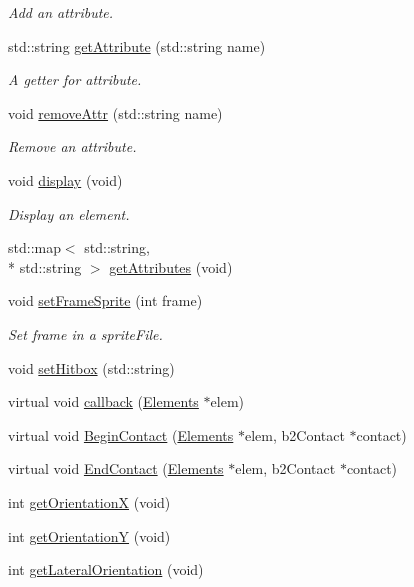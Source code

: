 \begin{DoxyCompactItemize}
\begin{DoxyCompactList}\small\item\em Add an attribute. \end{DoxyCompactList}\item 
std\-::string \hyperlink{class_elements_ab35a8e49a075adca1dee3e941865e20f}{get\-Attribute} (std\-::string name)
\begin{DoxyCompactList}\small\item\em A getter for attribute. \end{DoxyCompactList}\item 
void \hyperlink{class_elements_ae549e0c8599f06b42126c67c5dd68fd2}{remove\-Attr} (std\-::string name)
\begin{DoxyCompactList}\small\item\em Remove an attribute. \end{DoxyCompactList}\item 
void \hyperlink{class_elements_adeca7401d8bc32fa75e2c2a0b2627412}{display} (void)
\begin{DoxyCompactList}\small\item\em Display an element. \end{DoxyCompactList}\item 
std\-::map$<$ std\-::string, \\*
std\-::string $>$ \hyperlink{class_elements_aff6b1b8c11e8579384461eadc63ee39e}{get\-Attributes} (void)
\item 
void \hyperlink{class_elements_a3bb4cc2e2009d0e447fbdd0212a57b73}{set\-Frame\-Sprite} (int frame)
\begin{DoxyCompactList}\small\item\em Set frame in a sprite\-File. \end{DoxyCompactList}\item 
void \hyperlink{class_elements_ad7e4ecb2ecc2402cf892e60d8d803070}{set\-Hitbox} (std\-::string)
\item 
virtual void \hyperlink{class_elements_a85bc66fe037551fcfa0b606cf32c4478}{callback} (\hyperlink{class_elements}{Elements} $\ast$elem)
\item 
virtual void \hyperlink{class_elements_a108938e08197adc349e98fb91abe1b5a}{Begin\-Contact} (\hyperlink{class_elements}{Elements} $\ast$elem, b2\-Contact $\ast$contact)
\item 
virtual void \hyperlink{class_elements_a42c3b694edefcc789109bd952a66d918}{End\-Contact} (\hyperlink{class_elements}{Elements} $\ast$elem, b2\-Contact $\ast$contact)
\item 
int \hyperlink{class_elements_a2dd2e1e757c9077755bbe309c504740b}{get\-Orientation\-X} (void)
\item 
int \hyperlink{class_elements_a58d9facbd7f6264e8b4e2ff49f20d939}{get\-Orientation\-Y} (void)
\item 
int \hyperlink{class_elements_add4340c523571631da317d8a64fc1368}{get\-Lateral\-Orientation} (void)
\end{DoxyCompactItemize}
